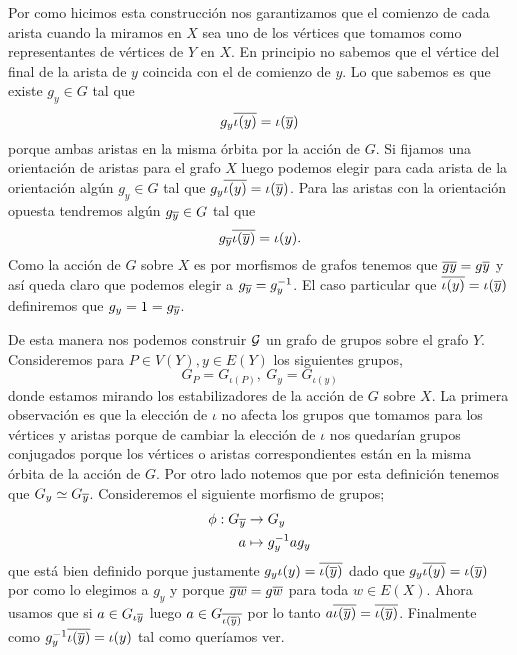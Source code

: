 \documentclass[tesis.tex]{subfiles}
\begin{document}
Por como hicimos esta construcción nos garantizamos que el comienzo de cada arista cuando la miramos en $X$ sea uno de los vértices que tomamos como representantes de vértices de $Y$ en $X$.
En principio no sabemos que el vértice del final de la arista de $y$ coincida con el de comienzo de $y$. 
Lo que sabemos es que existe $g_y \in G$ tal que 
\[
	g_y \overline{\iota (y)} = \iota (\overline y)
\]
porque ambas aristas en la misma órbita por la acción de $G$.
Si fijamos una orientación de aristas para el grafo $X$ luego podemos elegir para cada arista de la orientación algún $g_y \in G$ tal que $g_y \overline{\iota (y)} = \iota (\overline y)$.
Para las aristas con la orientación opuesta tendremos algún $g_{\overline y} \in G$ tal que 
\[
	g_{\overline y} \overline{\iota(\overline y)} = \iota(y).
\]
Como la acción de $G$ sobre $X$ es por morfismos de grafos tenemos que $\overline {g y} = g \overline y$ y así queda claro que podemos elegir a $g_{\overline y} = g_{y}^{-1}$.
El caso particular que $\overline{\iota (y)} = \iota (\overline y)$ definiremos que $g_y = 1 = g_{\overline y}$.

De esta manera nos podemos construir ${\cal G}$ un grafo de grupos sobre el grafo $Y$.
Consideremos para $P \in V(Y), y \in E(Y)$ los siguientes grupos,
\[
	G_P = G_{\iota (P)}, \ G_y = G_{\iota(y)}
\]
donde estamos mirando los estabilizadores de la acción de $G$ sobre $X$.
La primera observación es que la elección de $\iota$ no afecta los grupos que tomamos para los vértices y aristas porque de cambiar la elección de $\iota$ nos quedarían grupos conjugados porque los vértices o aristas correspondientes están en la misma órbita de la acción de $G$.
Por otro lado notemos que por esta definición tenemos que $G_y \simeq G_{\overline y}$.
Consideremos el siguiente morfismo de grupos;
\begin{align*}
	\phi: G_{\overline y} &\to G_{y} \\
	a &\mapsto g_{y}^{-1}ag_{y}
\end{align*}
que está bien definido porque justamente $g_y \iota(y) = \overline{\iota(\overline y)}$ dado que $g_y \overline{\iota(y)} = \iota (\overline y)$ por como lo elegimos a $g_y$ y porque $\overline{gw} = g \overline w$ para toda $w \in E(X)$.
Ahora usamos que si $a \in G_{\iota{\overline y}}$ luego $a \in G_{\overline{\iota(\overline y)}}$ por lo tanto $a \overline{\iota(\overline y)} = \overline{\iota(\overline y)} $.
Finalmente como $ g_{y}^{-1} \overline {\iota (\overline y) } = \iota (y)$ tal como queríamos ver.
\end{document}
